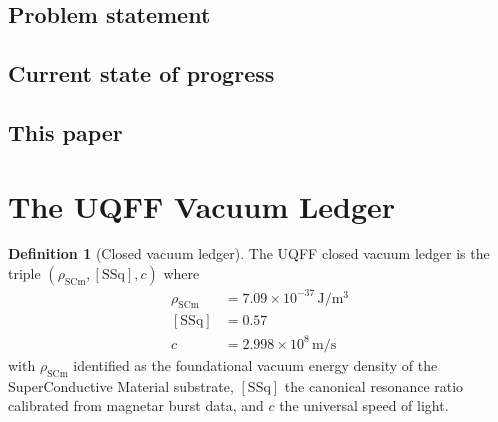 \documentclass[11pt,a4paper,onecolumn]{article}
\theoremstyle{plain}
\theoremstyle{definition}
\newtheorem{definition}[theorem]{Definition}
\theoremstyle{remark}
\begin{document}

\subsection{Problem statement}

\subsection{Current state of progress}

\subsection{This paper}

\section{The UQFF Vacuum Ledger}\label{sec:ledger}


\begin{definition}[Closed vacuum ledger]\label{def:ledger}
The UQFF closed vacuum ledger is the triple
$(\rho_{\mathrm{SCm}}, [\mathrm{SSq}], c)$ where
\begin{align*}
\rho_{\mathrm{SCm}} &= 7.09 \times 10^{-37}\,\mathrm{J/m^3} \\
[\mathrm{SSq}]      &= 0.57 \\
c                   &= 2.998 \times 10^8\,\mathrm{m/s}
\end{align*}
with $\rho_{\mathrm{SCm}}$ identified as the foundational vacuum
energy density of the SuperConductive Material substrate,
$[\mathrm{SSq}]$ the canonical resonance ratio calibrated from
magnetar burst data, and $c$ the universal speed of light.
\end{definition}
\end{document}
